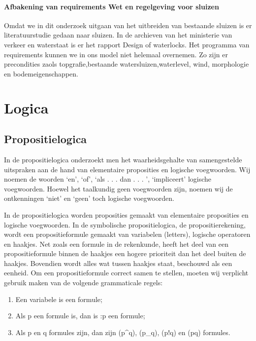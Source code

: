 \documentclass{article}
\begin{document}
	\paragraph{Afbakening van requirements Wet en regelgeving voor sluizen}
	Omdat we in dit onderzoek uitgaan van het uitbreiden van bestaande sluizen is er literatuurstudie gedaan naar sluizen. In de archieven van het ministerie van verkeer en waterstaat is er het rapport Design of waterlocks\cite{CivilEngineeringDivision}.
	Het programma van requirements kunnen we in ons model niet helemaal overnemen. 
	Zo zijn er precondities zaols topgrafie,bestaande watersluizen,waterlevel, wind, morphologie en bodemeigenschappen.
	
	
	
	\section{Logica}
	
	
	
	\subsection{Propositielogica}
	
	
	In de propositielogica onderzoekt men het waarheidsgehalte van samengestelde uitspraken
	aan de hand van elementaire proposities en logische voegwoorden. Wij noemen de
	woorden ‘en’, ‘of’, ‘als . . . dan . . . ’, ‘impliceert’ logische voegwoorden. Hoewel het taalkundig
	geen voegwoorden zijn, noemen wij de ontkenningen ‘niet’ en ‘geen’ toch logische
	voegwoorden.
	
	In de propositielogica worden proposities gemaakt van elementaire proposities en logische
	voegwoorden. In de symbolische propositielogica, de propositierekening, wordt een
	propositieformule gemaakt van variabelen (letters), logische operatoren en haakjes. Net
	zoals een formule in de rekenkunde, heeft het deel van een propositieformule binnen de
	haakjes een hogere prioriteit dan het deel buiten de haakjes. Bovendien wordt alles wat
	tussen haakjes staat, beschouwd als een eenheid. Om een propositieformule correct samen
	te stellen, moeten wij verplicht gebruik maken van de volgende grammaticale regels:
	\begin{enumerate}
		\item Een variabele is een formule;
		\item Als p een formule is, dan is :p een formule;
		\item Als p en q formules zijn, dan zijn (p^q), (p_q), (p!q) en (p\text{$}q) formules.
	\end{enumerate}
	
\end{document}
